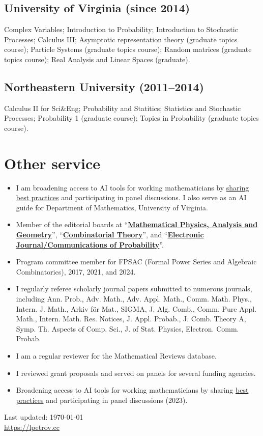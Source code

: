 \documentclass[letterpaper,11pt]{article}
\def\footerlink{https://lpetrov.cc}
\begin{document}
\subsection*{University of Virginia (since 2014)}

Complex Variables;
Introduction to Probability; 
Introduction to Stochastic Processes;
Calculus III;
Asymptotic representation theory (graduate topics course);
Particle Systems (graduate topics course);
Random matrices (graduate topics course);
Real Analysis and Linear Spaces (graduate).

\subsection*{Northeastern University (2011--2014)}

Calculus II for Sci\&Eng;
Probability and Statitics;
Statistics and Stochastic Processes; 
Probability 1 (graduate course);
Topics in Probability (graduate topics course).

\section*{Other service}

\begin{itemize}
	\item
	I am broadening access to AI tools for working mathematicians by \href{https://lpetrov.cc/AI-math/}{sharing} \href{https://storage.lpetrov.cc/research_files/talks/AI_UVA_Oct10.pdf}{best practices} and participating in panel discussions. I also serve as an AI guide for Department of Mathematics, University of Virginia.
	
	\item
	Member of the editorial boards at ``\href{https://www.springer.com/journal/11040}{\textbf{Mathematical Physics, Analysis and Geometry}}'', ``\href{https://escholarship.org/uc/combinatorial_theory/}{\textbf{Combinatorial Theory}}'', and ``\href{https://imstat.org/journals-and-publications/electronic-journal-of-probability/}{\textbf{Electronic Journal/Communications of Probability}}''.
	\item Program committee member for FPSAC (Formal Power Series and Algebraic Combinatorics),
		2017, 2021, and 2024.
	\item 
	I regularly referee scholarly journal papers submitted to numerous journals, 
	including
	Ann. Prob., Adv. Math., Adv. Appl. Math., Comm. Math. Phys., Intern. J. Math.,
	Arkiv f\"or Mat., SIGMA, J. Alg. Comb., Comm. Pure Appl. Math., Intern. Math.
	Res. Notices, J. Appl. Probab., J. Comb. Theory A, Symp. Th. Aspects of Comp.
	Sci., J. of Stat. Physics, Electron. Comm. Probab. 
	\item
	I am a regular
	reviewer for the Mathematical Reviews database. 
	\item
	I reviewed grant proposals and served on panels for several funding agencies.
	\item Broadening access to AI tools for working mathematicians by sharing \href{https://lpetrov.cc/AI-math/}{best practices} and participating in panel discussions (2023). 
\end{itemize}


\bigskip

\begin{center}
	\begin{footnotesize}
		Last updated: \today \\ \href{\footerlink}{\url{\footerlink}}
	\end{footnotesize}
\end{center}
\end{document}
